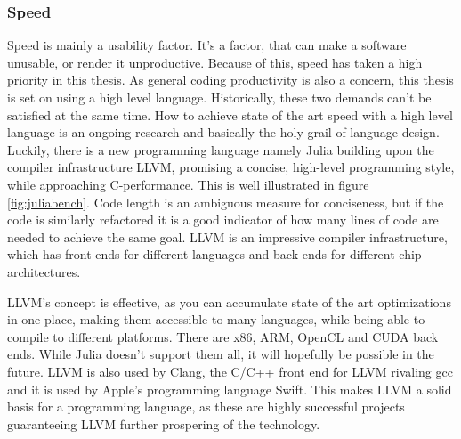 \subsubsection{Speed}
Speed is mainly a usability factor. It's a factor, that can make a software unusable, or render it unproductive. Because of this, speed has taken a high priority in this thesis. As general coding productivity is also a concern, this thesis is set on using a high level language.
Historically, these two demands can't be satisfied at the same time.
How to achieve state of the art speed with a high level language is an ongoing research and basically the holy grail of language design.
Luckily, there is a new programming language namely Julia building upon the compiler infrastructure \ac{LLVM}, promising a concise, high-level programming style, while approaching C-performance.
This is well illustrated in figure \ref{fig:juliabench}. Code length is an ambiguous measure for conciseness, but if the code is similarly refactored it is a good indicator of how many lines of code are needed to achieve the same goal.
\ac{LLVM} is an impressive compiler infrastructure, which has front ends for different languages and back-ends for different chip architectures. 

\ac{LLVM}'s concept is effective, as you can accumulate state of the art optimizations in one place, making them accessible to many languages, while being able to compile to different platforms. There are x86, ARM, \ac{OpenCL} and CUDA back ends. While Julia doesn't support them all, it will hopefully be possible in the future. 
\ac{LLVM} is also used by Clang, the C/C++ front end for \ac{LLVM} rivaling \ac{gcc} and it is used by Apple's programming language Swift. 
This makes \ac{LLVM} a solid basis for a programming language, as these are highly successful projects guaranteeing \ac{LLVM} further prospering of the technology.

